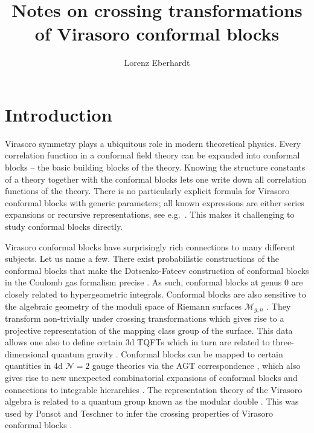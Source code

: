 \documentclass[12pt,a4paper]{article}
\title{Notes on crossing transformations of Virasoro conformal blocks}
\author{Lorenz Eberhardt}
\affiliation{School of Natural Sciences, Institute for Advanced Study, \\
\hspace*{0.3cm}Einstein Drive 1, Princeton,  NJ 08540, USA}
\begin{document}

\maketitle



\makeatletter
\g@addto@macro\bfseries{\boldmath}
\makeatother



\section{Introduction}
Virasoro symmetry plays a ubiquitous role in modern theoretical physics. Every correlation function in a conformal field theory can be expanded into conformal blocks -- the basic building blocks of the theory. Knowing the structure constants of a theory together with the conformal blocks lets one write down all correlation functions of the theory.
There is no particularly explicit formula for Virasoro conformal blocks with generic parameters; all known expressions are either series expansions or recursive representations, see e.g.\ \cite{Belavin:1984vu, Zamolodchikov:1984eqp,Zamolodchikov_recursion2, Alba:2010qc, Perlmutter:2015iya}. This makes it challenging to study conformal blocks directly.

Virasoro conformal blocks have surprisingly rich connections to many different subjects. Let us name a few. There exist probabilistic constructions of the conformal blocks \cite{Guillarmou:2020wbo, Ghosal:2020sis, Ghosal} that make the Dotsenko-Fateev construction of conformal blocks in the Coulomb gas formalism precise \cite{Dotsenko:1984nm}. 
As such, conformal blocks at genus 0 are closely related to hypergeometric integrals.
Conformal blocks are also sensitive to the algebraic geometry of the moduli space of Riemann surfaces $\mathcal{M}_{g,n}$ \cite{Friedan:1986ua}.
They transform non-trivially under crossing transformations which gives rise to a projective representation of the mapping class group of the surface.
This data allows one also to define certain 3d TQFTs \cite{Teschner:2005bz} which in turn are related to three-dimensional quantum gravity \cite{Collier:2023fwi}.
Conformal blocks can be mapped to certain quantities in 4d $\mathcal{N}=2$ gauge theories via the AGT correspondence \cite{Alday:2009aq}, which also gives rise to new unexpected combinatorial expansions of conformal blocks and connections to integrable hierarchies \cite{Alba:2010qc, Gamayun:2012ma}.
The representation theory of the Virasoro algebra is related to a quantum group known as the modular double \cite{Faddeev:1999fe}. This was used by Ponsot and Teschner to infer the crossing properties of Virasoro conformal blocks \cite{Ponsot:1999uf, Ponsot:2000mt}.
\end{document}
